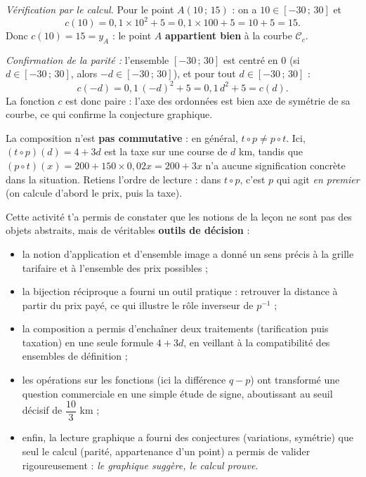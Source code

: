 \documentclass[11pt]{article}
\newcommand{\cle}[1]{{\popxbold\color{popdark}#1}}
\newcounter{popsec}
\newcounter{popsub}
\newcommand{\courssub}[1]{%
  \stepcounter{popsub}%
  \par\vspace{9pt}\noindent{\popxbold\fontsize{11.5}{13}\selectfont\color{popink}{\color{poporange}\thepopsec.\thepopsub}\hspace{6pt}#1}\par\nopagebreak\vspace{4pt}
}
\begin{document}
\begin{exoresolu}
\emph{Vérification par le calcul.} Pour le point $A(10\,;\,15)$ : on a $10 \in [-30\,;\,30]$ et
\[ c(10) = 0{,}1 \times 10^{2} + 5 = 0{,}1 \times 100 + 5 = 10 + 5 = 15. \]
Donc $c(10) = 15 = y_A$ : le point $A$ \textbf{appartient bien} à la courbe $\mathcal{C}_c$.

\emph{Confirmation de la parité :} l'ensemble $[-30\,;\,30]$ est centré en $0$ (si $d \in [-30\,;\,30]$, alors $-d \in [-30\,;\,30]$), et pour tout $d \in [-30\,;\,30]$ :
\[ c(-d) = 0{,}1\,(-d)^{2} + 5 = 0{,}1\,d^{2} + 5 = c(d). \]
La fonction $c$ est donc \cle{paire} : l'axe des ordonnées est bien axe de symétrie de sa courbe, ce qui confirme la conjecture graphique.
\end{exoresolu}

\begin{attention}
La composition n'est \textbf{pas commutative} : en général, $t \circ p \neq p \circ t$. Ici, $(t \circ p)(d) = 4 + 3d$ est la taxe sur une course de $d$ km, tandis que $(p \circ t)(x) = 200 + 150 \times 0{,}02x = 200 + 3x$ n'a aucune signification concrète dans la situation. Retiens l'ordre de lecture : dans $t \circ p$, c'est $p$ qui agit \emph{en premier} (on calcule d'abord le prix, puis la taxe).
\end{attention}

\courssub{Bilan de l'activité}

Cette activité t'a permis de constater que les notions de la leçon ne sont pas des objets abstraits, mais de véritables \textbf{outils de décision} :

\begin{itemize}
\item la notion d'\cle{application} et d'\cle{ensemble image} a donné un sens précis à la grille tarifaire et à l'ensemble des prix possibles ;
\item la \cle{bijection réciproque} a fourni un outil pratique : retrouver la distance à partir du prix payé, ce qui illustre le rôle \og inverseur \fg{} de $p^{-1}$ ;
\item la \cle{composition} a permis d'enchaîner deux traitements (tarification puis taxation) en une seule formule $4 + 3d$, en veillant à la compatibilité des ensembles de définition ;
\item les \cle{opérations sur les fonctions} (ici la différence $q - p$) ont transformé une question commerciale en une simple étude de signe, aboutissant au seuil décisif de $\dfrac{10}{3}$ km ;
\item enfin, la \cle{lecture graphique} a fourni des conjectures (variations, symétrie) que seul le \cle{calcul} (parité, appartenance d'un point) a permis de valider rigoureusement : \emph{le graphique suggère, le calcul prouve}.
\end{itemize}
\end{document}
